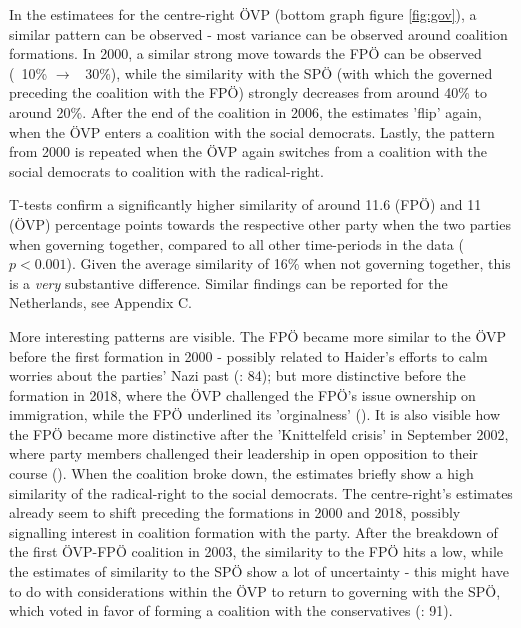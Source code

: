 \documentclass{article}
\begin{document}
In the estimatees for the centre-right ÖVP (bottom graph figure \ref{fig:gov}), a similar pattern can be observed - most variance can be observed around coalition formations. In 2000, a similar strong move towards the FPÖ can be observed (~10\% $\rightarrow$ ~30\%), while the similarity with the SPÖ (with which the governed preceding the coalition with the FPÖ) strongly decreases from around 40\% to around 20\%. After the end of the coalition in 2006, the estimates 'flip' again, when the ÖVP enters a coalition with the social democrats. Lastly, the pattern from 2000 is repeated when the ÖVP again switches from a coalition with the social democrats to  coalition with the radical-right.\par

T-tests confirm a significantly higher similarity of around 11.6 (FPÖ) and 11 (ÖVP) percentage points towards the respective other party when the two parties when governing together, compared to all other time-periods in the data ($p<0.001$). Given the average similarity of 16\% when not governing together, this is a \textit{very} substantive difference. Similar findings can be reported for the Netherlands, see Appendix C.\par

More interesting patterns are visible. The FPÖ became more similar to the ÖVP before the first formation in 2000 - possibly related to Haider's efforts to calm worries about the parties' Nazi past (\cite{Luther2010}: 84); but more distinctive before the formation in 2018, where the ÖVP challenged the FPÖ's issue ownership on immigration, while the FPÖ underlined its 'orginalness' (\cite{Bodlos2018}). It is also visible how the FPÖ became more distinctive after the 'Knittelfeld crisis' in September 2002, where party members challenged their leadership in open opposition to their course (\cite{Luther2002}). When the coalition broke down, the estimates briefly show a high similarity of the radical-right to the social democrats. The centre-right's estimates already seem to shift preceding the formations in 2000 and 2018, possibly signalling interest in coalition formation with the party. After the breakdown of the first ÖVP-FPÖ coalition in 2003, the similarity to the FPÖ hits a low, while the estimates of similarity to the SPÖ show a lot of uncertainty - this might have to do with considerations within the ÖVP to return to governing with the SPÖ, which voted in favor of forming a coalition with the conservatives (\cite{Luther2010}: 91). \par
\end{document}
